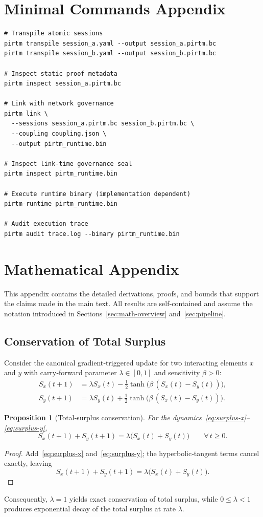 \documentclass[11pt]{article}
\newtheorem{proposition}{Proposition}
\begin{document}
\section{Minimal Commands Appendix}

\begin{lstlisting}[style=plain,caption={Illustrative command sequence for the disclosed toolchain}]
# Transpile atomic sessions
pirtm transpile session_a.yaml --output session_a.pirtm.bc
pirtm transpile session_b.yaml --output session_b.pirtm.bc

# Inspect static proof metadata
pirtm inspect session_a.pirtm.bc

# Link with network governance
pirtm link \
  --sessions session_a.pirtm.bc session_b.pirtm.bc \
  --coupling coupling.json \
  --output pirtm_runtime.bin

# Inspect link-time governance seal
pirtm inspect pirtm_runtime.bin

# Execute runtime binary (implementation dependent)
pirtm-runtime pirtm_runtime.bin

# Audit execution trace
pirtm audit trace.log --binary pirtm_runtime.bin
\end{lstlisting}

\section{Mathematical Appendix}
This appendix contains the detailed derivations, proofs, and bounds that support the claims made in the main text. All results are self‑contained and assume the notation introduced in Sections~\ref{sec:math-overview} and~\ref{sec:pipeline}.

\subsection{Conservation of Total Surplus}
Consider the canonical gradient‑triggered update for two interacting elements $x$ and $y$ with carry‑forward parameter $\lambda\in[0,1]$ and sensitivity $\beta>0$:
\begin{align}
    S_x(t+1) &= \lambda S_x(t) - \frac12\tanh\!\bigl(\beta\,(S_x(t)-S_y(t))\bigr), \label{eq:surplus-x}\\
    S_y(t+1) &= \lambda S_y(t) + \frac12\tanh\!\bigl(\beta\,(S_x(t)-S_y(t))\bigr). \label{eq:surplus-y}
\end{align}
\begin{proposition}[Total‑surplus conservation]\label{prop:total-surplus}
For the dynamics~\eqref{eq:surplus-x}--\eqref{eq:surplus-y},
\[
    S_x(t+1)+S_y(t+1)=\lambda\bigl(S_x(t)+S_y(t)\bigr)\qquad\forall\,t\ge0.
\]
\end{proposition}
\begin{proof}
Add~\eqref{eq:surplus-x} and~\eqref{eq:surplus-y}; the hyperbolic‑tangent terms cancel exactly, leaving
\[
S_x(t+1)+S_y(t+1)=\lambda\bigl(S_x(t)+S_y(t)\bigr).
\]
\end{proof}
Consequently, $\lambda=1$ yields exact conservation of total surplus, while $0\le\lambda<1$ produces exponential decay of the total surplus at rate $\lambda$.
\end{document}
